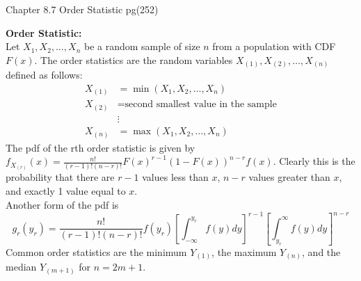 \documentclass[answers,12pt,addpoints]{exam}
\begin{document}
Chapter 8.7 Order Statistic pg(252)\\
\begin{definition}
    \textbf{Order Statistic:}\\
    Let $X_1, X_2, \ldots, X_n$ be a random sample of size $n$ from a population with CDF $F(x)$. The order statistics are the random variables $X_{(1)}, X_{(2)}, \ldots, X_{(n)}$ defined as follows:
    \begin{align*}
        X_{(1)} &= \min(X_1, X_2, \ldots, X_n)\\
        X_{(2)} &= \text{second smallest value in the sample}\\
        &\vdots\\
        X_{(n)} &= \max(X_1, X_2, \ldots, X_n)
    \end{align*}
    The pdf of the rth order statistic is given by $f_{X_{(r)}}(x) = \frac{n!}{(r-1)!(n-r)!}F(x)^{r-1}(1-F(x))^{n-r}f(x)$. Clearly this is the probability that there are $r-1$ values less than $x$, $n-r$ values greater than $x$, and exactly 1 value equal to $x$.\\
    Another form of the pdf is 
    $$ g_r(y_r) = \frac{n!}{(r-1)!(n-r)!}f(y_r)[\int_{-\infty}^{y_r}f(y)dy]^{r-1}[\int_{y_r}^{\infty}f(y)dy]^{n-r}$$
    Common order statistics are the minimum $Y_{(1)}$, the maximum $Y_{(n)}$, and the median $Y_{(m+1)}$ for $n = 2m+1$.
\end{definition}
\end{document}
